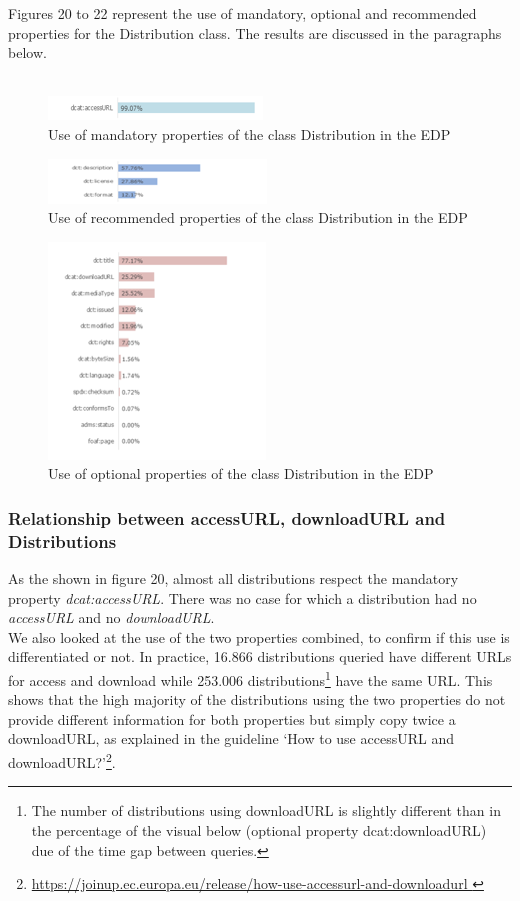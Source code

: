 \documentclass[<options>]{elsarticle}
\begin{document}
Figures 20 to 22 represent the use of mandatory, optional and recommended properties for the Distribution class. The results are discussed in the paragraphs below.
\\
\\
\begin{figure}[H]
\includegraphics{replace23.png}
\caption{Use of mandatory properties of the class Distribution in the EDP}
\end{figure}
\begin{figure}[H]
\includegraphics{replace24.png}
\caption{Use of recommended properties of the class Distribution in the EDP}
\end{figure}
\begin{figure}[H]
\includegraphics{replace25.png}
\caption{Use of optional properties of the class Distribution in the EDP}
\end{figure}

\subsubsection{Relationship between accessURL, downloadURL and Distributions}

As the shown in figure 20, almost all distributions respect the mandatory property \textit{dcat:accessURL}. There was no case for which a distribution had no \textit{accessURL} and no \textit{downloadURL}.\\
We also looked at the use of the two properties combined, to confirm if this use is differentiated or not. In practice, 16.866 distributions queried have different URLs for access and download while 253.006 distributions\footnote{The number of distributions using downloadURL is slightly different than in the percentage of the visual below (optional property dcat:downloadURL) due of the time gap between queries.}  have the same URL. This shows that the high majority of the distributions using the two properties do not provide different information for both properties but simply copy twice a downloadURL, as explained in the guideline ‘How to use accessURL and downloadURL?’\footnote{\href{   https://joinup.ec.europa.eu/release/how-use-accessurl-and-downloadurl }{https://joinup.ec.europa.eu/release/how-use-accessurl-and-downloadurl }}.
\end{document}
